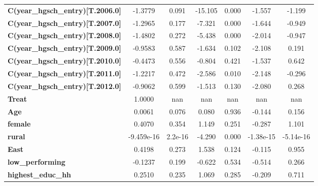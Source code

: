 \begin{center}
\begin{tabular}{lcccccc}
\textbf{C(year\_hgsch\_entry)[T.2006.0]} &      -1.3779  &        0.091     &   -15.105  &         0.000        &       -1.557    &       -1.199     \\
\textbf{C(year\_hgsch\_entry)[T.2007.0]} &      -1.2965  &        0.177     &    -7.321  &         0.000        &       -1.644    &       -0.949     \\
\textbf{C(year\_hgsch\_entry)[T.2008.0]} &      -1.4802  &        0.272     &    -5.438  &         0.000        &       -2.014    &       -0.947     \\
\textbf{C(year\_hgsch\_entry)[T.2009.0]} &      -0.9583  &        0.587     &    -1.634  &         0.102        &       -2.108    &        0.191     \\
\textbf{C(year\_hgsch\_entry)[T.2010.0]} &      -0.4473  &        0.556     &    -0.804  &         0.421        &       -1.537    &        0.642     \\
\textbf{C(year\_hgsch\_entry)[T.2011.0]} &      -1.2217  &        0.472     &    -2.586  &         0.010        &       -2.148    &       -0.296     \\
\textbf{C(year\_hgsch\_entry)[T.2012.0]} &      -0.9062  &        0.599     &    -1.513  &         0.130        &       -2.080    &        0.268     \\
\textbf{Treat}                           &       1.0000  &          nan     &       nan  &           nan        &          nan    &          nan     \\
\textbf{Age}                             &       0.0061  &        0.076     &     0.080  &         0.936        &       -0.144    &        0.156     \\
\textbf{female}                          &       0.4070  &        0.354     &     1.149  &         0.251        &       -0.287    &        1.101     \\
\textbf{rural}                           &   -9.459e-16  &      2.2e-16     &    -4.290  &         0.000        &    -1.38e-15    &    -5.14e-16     \\
\textbf{East}                            &       0.4198  &        0.273     &     1.538  &         0.124        &       -0.115    &        0.955     \\
\textbf{low\_performing}                 &      -0.1237  &        0.199     &    -0.622  &         0.534        &       -0.514    &        0.266     \\
\textbf{highest\_educ\_hh}               &       0.2510  &        0.235     &     1.069  &         0.285        &       -0.209    &        0.711     \\

\end{tabular}
\end{center}

